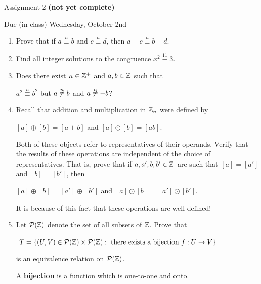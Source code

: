 \documentclass[11pt,fleqn,dvipsnames,usenames]{article}
\renewcommand{\headrulewidth}{1pt}
\newcommand{\p}{\noindent}
\begin{document}
\fancyhead[L]{\course}
\fancyhead[R]{\term}
\renewcommand{\headrulewidth}{0.4pt}

\begin{center}
{\huge Assignment 2 \textbf{(not yet complete)}}
\vsp

{\large Due (in-class) Wednesday, October 2nd}
\end{center}

\begin{enumerate}
\item Prove that if $a\overset{n}{\equiv}b$ and $c\overset{n}{\equiv}d$, then $a-c\overset{n}{\equiv}b-d$.
\item Find all integer solutions to the congruence $x^2\overset{11}{\equiv}3$.
\item Does there exist $n\in\mathbb{Z}^{+}$ and $a,b\in\mathbb{Z}$ such that
\begin{center}
$a^2\overset{n}{\equiv}b^2$ but $a\not\overset{n}{\equiv}b$ and $a\not\overset{n}{\equiv}-b$?
\end{center}
\item Recall that addition and multiplication in $\mathbb{Z}_n$ were defined by
\begin{center}
$[a] \oplus [b] = [a + b]$ and $[a]\odot [b] = [ab]$.
\end{center}
\p Both of these objects refer to representatives of their operands.  Verify that the results of these operations are independent of the choice of representatives.  That is, prove that if $a,a',b,b'\in\mathbb{Z}$ are such that $[a] = [a']$ and $[b] = [b']$, then
\begin{center}
$[a]\oplus [b] = [a']\oplus [b']$ and $[a]\odot [b] = [a']\odot [b']$.
\end{center}

\note It is because of this fact that these operations are well defined!

\item Let $\mathcal{P}(\mathbb{Z})$ denote the set of all subsets of $\mathbb{Z}$.  Prove that
\begin{center}
$T = \left\{(U,V)\in \mathcal{P}(\mathbb{Z})\times\mathcal{P}(\mathbb{Z}):\text{ there exists a bijection }f:U\to V\right\}$
\end{center}
is an equivalence relation on $\mathcal{P}(\mathbb{Z})$.
\vsmsp

\recall A \textbf{bijection} is a function which is one-to-one and onto.
\end{enumerate}
\vsmsp
\end{document}
